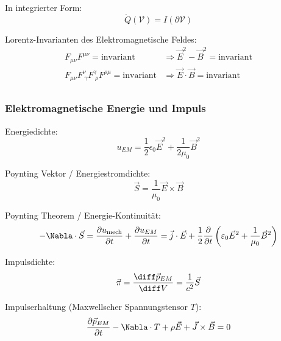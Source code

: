 \documentclass[11pt]{article}
\numberwithin{equation}{section}
\begin{document}
      In integrierter Form:
      \begin{equation}
        \dot{Q}(\mathcal{V}) = I(\partial\mathcal{V})
      \end{equation}

      Lorentz-Invarianten des Elektromagnetische Feldes:
      \begin{equation}
        \begin{aligned}
          F_{\mu\nu} F^{\mu\nu} = \mathrm{invariant} &\Rightarrow \vec{E}^2 - \vec{B}^2 = \mathrm{invariant} \\
          F_{\mu\nu} F^{\nu}_{\;\gamma} F^{\gamma}_{\;\rho} F^{\rho\mu} = \mathrm{invariant} &\Rightarrow \vec{E}\cdot \vec{B} = \mathrm{invariant} \\
        \end{aligned}
      \end{equation}

      \subsubsection{Elektromagnetische Energie und Impuls}
        Energiedichte:
        \begin{equation}
          u_{EM}=\frac{1}{2}\epsilon_0 \vec{E}^2+\frac{1}{2\mu_0}\vec{B}^2
        \end{equation}

        Poynting Vektor / Energiestromdichte:
        \begin{equation}
          \vec{S} = \frac{1}{\mu_0}\vec{E}\times\vec{B}
        \end{equation}

        Poynting Theorem / Energie-Kontinuität:
        \begin{equation}
          -\Nabla\cdot\vec{S}
          = \pder{u_{\mathrm{mech}}}{t} + \pder{u_{EM}}{t}
          = \vec{j}\cdot\vec{E} + \frac{1}{2}\pder{}{t}\Br{\varepsilon_0\vec{E}^2 + \frac{1}{\mu_0}\vec{B}^2}
        \end{equation}

        Impulsdichte:
        \begin{equation}
          \vec{\pi} = \tder{\vec{p}_{EM}}{V} = \frac{1}{c^2}\vec{S}
        \end{equation}

        Impulserhaltung (Maxwellscher Spannungstensor $T$):
        \begin{equation}
          \pder{\vec{p}_{EM}}{t} - \Nabla\cdot T + \rho \vec{E} + \vec{J}\times\vec{B} = 0
        \end{equation}
\end{document}
